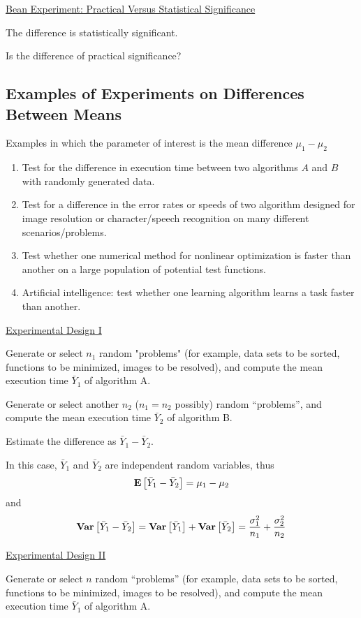 \underline{Bean Experiment: Practical Versus Statistical Significance}

The difference is statistically significant.

Is the difference of practical significance?

\subsection{Examples of Experiments on Differences Between Means}
Examples in which the parameter of interest is the mean difference $\mu_{1}-\mu_{2}$
\begin{enumerate}
    \item Test for the difference in execution time between two algorithms
          $A$ and $B$ with randomly generated data.
    \item Test for a difference in the error rates or speeds of two algorithm
          designed for image resolution or character/speech recognition on many different scenarios/problems.
    \item Test whether one numerical method for nonlinear optimization is faster
          than another on a large population of potential test functions.
    \item Artificial intelligence: test whether one learning algorithm learns a task faster than another.
\end{enumerate}

\underline{Experimental Design I}

Generate or select $n_{1}$ random "problems" (for example, data sets to be sorted,
functions to be minimized, images to be resolved), and compute the mean execution time $\bar{Y}_{1}$ of
algorithm A.

Generate or select another $n_{2}$ ($n_{1}=n_{2}$ possibly)
random ``problems'', and compute the mean execution time $\bar{Y}_{2}$ of algorithm B.

Estimate the difference as $\bar{Y}_{1}-\bar{Y}_{2}$.

In this case, $\bar{Y}_{1}$ and $\bar{Y}_{2}$ are independent random variables, thus
\[\bm{\mathrm{E}}\left[\bar{Y}_{1}-\bar{Y}_{2}\right]=\mu_{1}-\mu_{2}\]
and
\[\bm{\mathrm{Var}}\left[\bar{Y}_{1}-\bar{Y}_{2}\right]
    =\bm{\mathrm{Var}}\left[\bar{Y}_{1}\right]+\bm{\mathrm{Var}}\left[\bar{Y}_{2}\right]
    =\frac{\sigma_{1}^{2}}{n_{1}}+\frac{\sigma_{2}^{2}}{n_{2}}
\]

\underline{Experimental Design II}

Generate or select $n$ random ``problems''
(for example, data sets to be sorted, functions to be minimized, images to be resolved),
and compute the mean execution time $\bar{Y}_{1}$ of algorithm A.

